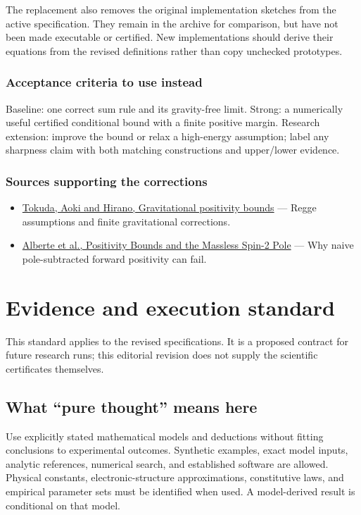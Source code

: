 \documentclass[
  11pt,
]{article}
\begin{document}
The replacement also removes the original implementation sketches from
the active specification. They remain in the archive for comparison, but
have not been made executable or certified. New implementations should
derive their equations from the revised definitions rather than copy
unchecked prototypes.

\subsubsection{Acceptance criteria to use instead}

Baseline: one correct sum rule and its gravity-free limit. Strong: a
numerically useful certified conditional bound with a finite positive
margin. Research extension: improve the bound or relax a high-energy
assumption; label any sharpness claim with both matching constructions
and upper/lower evidence.

\subsubsection{Sources supporting the corrections}

\begin{itemize}
\item
  \href{https://arxiv.org/abs/2007.15009}{Tokuda, Aoki and Hirano,
  Gravitational positivity bounds} --- Regge assumptions and finite
  gravitational corrections.
\item
  \href{https://arxiv.org/abs/2007.12667}{Alberte et al., Positivity
  Bounds and the Massless Spin-2 Pole} --- Why naive pole-subtracted
  forward positivity can fail.
\end{itemize}

\section{Evidence and execution standard}

This standard applies to the revised specifications. It is a proposed
contract for future research runs; this editorial revision does not
supply the scientific certificates themselves.

\subsection{What ``pure thought'' means here}

Use explicitly stated mathematical models and deductions without fitting
conclusions to experimental outcomes. Synthetic examples, exact model
inputs, analytic references, numerical search, and established software
are allowed. Physical constants, electronic-structure approximations,
constitutive laws, and empirical parameter sets must be identified when
used. A model-derived result is conditional on that model.
\end{document}
